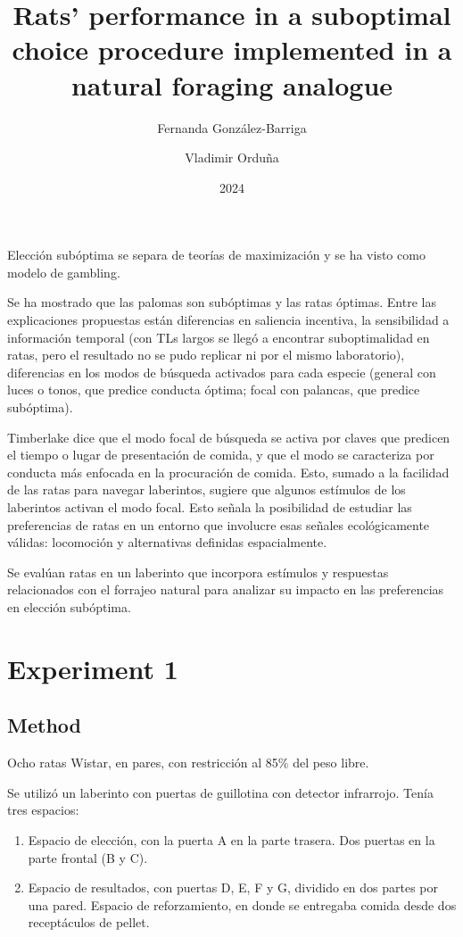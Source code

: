 \documentclass[a4paper,12pt]{article}
\title{Rats' performance in a suboptimal choice procedure implemented in a natural foraging analogue}
\author{Fernanda González-Barriga \and Vladimir Orduña}
\date{2024}
\begin{document}
{\scshape\bfseries \maketitle}

Elección subóptima se separa de teorías de maximización y se ha visto como modelo de gambling.

Se ha mostrado que las palomas son subóptimas y las ratas óptimas.
Entre las explicaciones propuestas están diferencias en saliencia incentiva, la sensibilidad a información temporal (con TLs largos se llegó a encontrar suboptimalidad en ratas, pero el resultado no se pudo replicar ni por el mismo laboratorio), diferencias en los modos de búsqueda activados para cada especie (general con luces o tonos, que predice conducta óptima; focal con palancas, que predice subóptima).

Timberlake dice que el modo focal de búsqueda se activa por claves que predicen el tiempo o lugar de presentación de comida, y que el modo se caracteriza por conducta más enfocada en la procuración de comida.
Esto, sumado a la facilidad de las ratas para navegar laberintos, sugiere que algunos estímulos de los laberintos activan el modo focal.
Esto señala la posibilidad de estudiar las preferencias de ratas en un entorno que involucre esas señales ecológicamente válidas: locomoción y alternativas definidas espacialmente.

Se evalúan ratas en un laberinto que incorpora estímulos y respuestas relacionados con el forrajeo natural para analizar su impacto en las preferencias en elección subóptima.

\section{Experiment 1}

\subsection{Method}

Ocho ratas Wistar, en pares, con restricción al 85\% del peso libre.

Se utilizó un laberinto con puertas de guillotina con detector infrarrojo.
Tenía tres espacios:
\begin{enumerate}
    \item Espacio de elección, con la puerta A en la parte trasera.
	Dos puertas en la parte frontal (B y C).
    \item Espacio de resultados, con puertas D, E, F y G, dividido en dos partes por una pared.
	Espacio de reforzamiento, en donde se entregaba comida desde dos receptáculos de pellet.
\end{enumerate}
\end{document}
